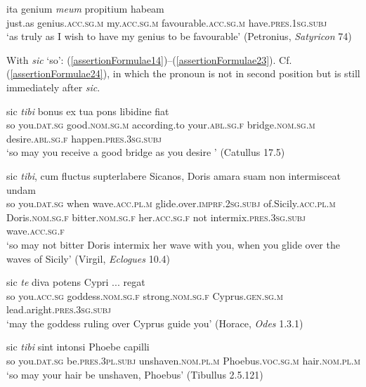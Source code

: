 \begin{exe}
\ex
\gll ita genium \emph{meum} propitium habeam\\
just.as genius.\textsc{acc.sg.m} my.\textsc{acc.sg.m} favourable.\textsc{acc.sg.m} have.\textsc{pres.1sg.subj}\\
\trans `as truly as I wish to have my genius to be favourable' (Petronius, \textit{Satyricon} 74)
\label{assertionFormulae13}
\end{exe}

With \emph{sic} `so': (\ref{assertionFormulae14})--(\ref{assertionFormulae23}). Cf. (\ref{assertionFormulae24}), in which the pronoun is not in second position but is still immediately after \emph{sic}.

\begin{exe}
\ex
\gll sic \emph{tibi} bonus ex tua pons libidine fiat\\
so you.\textsc{dat.sg} good.\textsc{nom.sg.m} according.to your.\textsc{abl.sg.f} bridge.\textsc{nom.sg.m} desire.\textsc{abl.sg.f} happen.\textsc{pres.3sg.subj}\\
\trans `so may you receive a good bridge as you desire ’ (Catullus 17.5)
\label{assertionFormulae14}
\end{exe}

\begin{exe}
\ex
\gll sic \emph{tibi}, cum fluctus supterlabere Sicanos, Doris amara suam non intermisceat undam\\
so you.\textsc{dat.sg} when wave.\textsc{acc.pl.m} glide.over.\textsc{imprf.2sg.subj} of.Sicily.\textsc{acc.pl.m} Doris.\textsc{nom.sg.f} bitter.\textsc{nom.sg.f} her.\textsc{acc.sg.f} not intermix.\textsc{pres.3sg.subj} wave.\textsc{acc.sg.f}\\
\trans `so may not bitter Doris intermix her wave with you, when you glide over the waves of Sicily’ (Virgil, \textit{Eclogues} 10.4)
\label{assertionFormulae15}
\end{exe}

\begin{exe}
\ex
\gll sic \emph{te} diva potens Cypri ... regat\\
so you.\textsc{acc.sg} goddess.\textsc{nom.sg.f} strong.\textsc{nom.sg.f} Cyprus.\textsc{gen.sg.m} ~ lead.aright.\textsc{pres.3sg.subj}\\
\trans `may the goddess ruling over Cyprus guide you’ (Horace, \textit{Odes} 1.3.1)
\label{assertionFormulae16}
\end{exe}

\begin{exe}
\ex
\gll sic \emph{tibi} sint intonsi Phoebe capilli\\
so you.\textsc{dat.sg} be.\textsc{pres.3pl.subj} unshaven.\textsc{nom.pl.m} Phoebus.\textsc{voc.sg.m} hair.\textsc{nom.pl.m}\\
\trans `so may your hair be unshaven, Phoebus’ (Tibullus 2.5.121)
\label{assertionFormulae17}
\end{exe}

